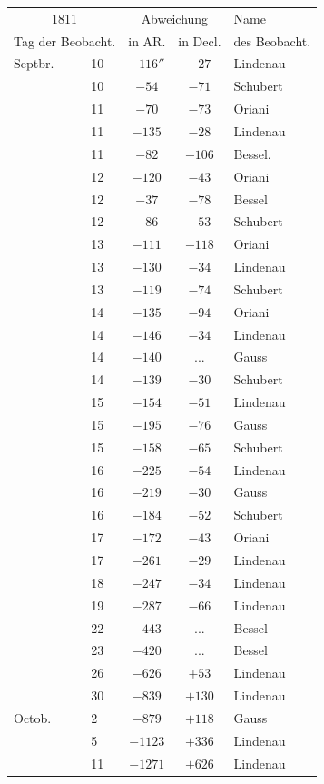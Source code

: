 \begin{center}

\fontsize{10}{12}\selectfont\setlength{\tabcolsep}{7pt}\renewcommand{\arraystretch}{1.05}\begin{tabular}{ll|c|c|l}
\multicolumn{2}{c|}{1811} & \multicolumn{2}{c|}{Abweichung} & Name \\
\multicolumn{2}{c|}{Tag der Beobacht.} & in AR. & in Decl. & des Beobacht. \\\hline
Septbr. & 10 & $-116''$ & $-27$ & Lindenau \\
 & 10 & $-54$ & $-71$ & Schubert \\
 & 11 & $-70$ & $-73$ & Oriani \\
 & 11 & $-135$ & $-28$ & Lindenau \\
 & 11 & $-82$ & $-106$ & Bessel. \\
 & 12 & $-120$ & $-43$ & Oriani \\
 & 12 & $-37$ & $-78$ & Bessel \\
 & 12 & $-86$ & $-53$ & Schubert \\
 & 13 & $-111$ & $-118$ & Oriani \\
 & 13 & $-130$ & $-34$ & Lindenau \\
 & 13 & $-119$ & $-74$ & Schubert \\
 & 14 & $-135$ & $-94$ & Oriani \\
 & 14 & $-146$ & $-34$ & Lindenau \\
 & 14 & $-140$ & .\;.\;. & Gauss \\
 & 14 & $-139$ & $-30$ & Schubert \\
 & 15 & $-154$ & $-51$ & Lindenau \\
 & 15 & $-195$ & $-76$ & Gauss \\
 & 15 & $-158$ & $-65$ & Schubert \\
 & 16 & $-225$ & $-54$ & Lindenau \\
 & 16 & $-219$ & $-30$ & Gauss \\
 & 16 & $-184$ & $-52$ & Schubert \\
 & 17 & $-172$ & $-43$ & Oriani \\
 & 17 & $-261$ & $-29$ & Lindenau \\
 & 18 & $-247$ & $-34$ & Lindenau \\
 & 19 & $-287$ & $-66$ & Lindenau \\
 & 22 & $-443$ & .\;.\;. & Bessel \\
 & 23 & $-420$ & .\;.\;. & Bessel \\
 & 26 & $-626$ & $+53$ & Lindenau \\
 & 30 & $-839$ & $+130$ & Lindenau \\
Octob. & 2 & $-879$ & $+118$ & Gauss \\
 & 5 & $-1123$ & $+336$ & Lindenau \\
 & 11 & $-1271$ & $+626$ & Lindenau \\
\end{tabular}

\end{center}

